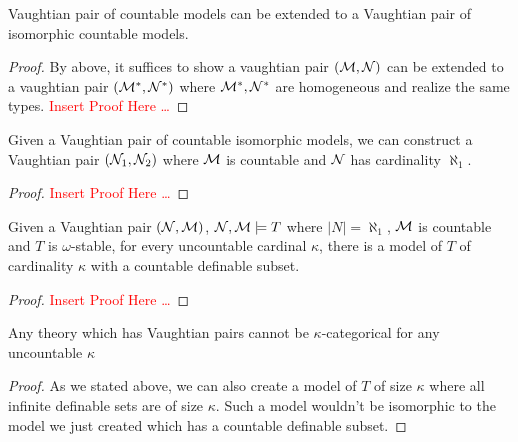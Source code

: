 
\begin{theorem}\label{theorem_vaughtian_pairs_countable_isomorphic}
Vaughtian pair of countable models can be extended to a Vaughtian pair of isomorphic countable models.
\end{theorem}

\begin{proof}
By above, it suffices to show a vaughtian pair \((\mathcal{M}, \mathcal{N})\) can be extended to a vaughtian pair \((\mathcal{M}^*, \mathcal{N}^*)\) where \(\mathcal{M}^*, \mathcal{N}^*\) are homogeneous and realize the same types. 
\textcolor{red}{Insert Proof Here \ldots}
\end{proof}

\begin{theorem}\label{theorem_aleph_one_vaightian_pairs}
Given a Vaughtian pair of countable isomorphic models, we can construct a Vaughtian pair \((\mathcal{N}_1, \mathcal{N}_2)\) where \(\mathcal{M}\) is countable and \(\mathcal{N}\) has cardinality \(\aleph_1\). %
\end{theorem}

\begin{proof}
\textcolor{red}{Insert Proof Here \ldots} 
\end{proof}

\begin{theorem}\label{theorem_uncountable_vaightian_pairs}
Given a Vaughtian pair \((\mathcal{N}, \mathcal{M})\), \(\mathcal{N}, \mathcal{M} \models T\) where \(|N| = \aleph_1\), \(\mathcal{M}\) is countable and \(T\) is \(\omega\)-stable, for every uncountable cardinal \(\kappa\), there is a model of \(T\) of cardinality \(\kappa\) with a countable definable subset.  
\end{theorem}

\begin{proof}
\textcolor{red}{Insert Proof Here \ldots} 
\end{proof}

\begin{theorem}\label{theorem_vaughtian_pairs_categoricity}
Any theory which has Vaughtian pairs cannot be \(\kappa\)-categorical for any uncountable \(\kappa\)
\end{theorem}

\begin{proof}
As we stated above, we can also create a model of \(T\) of size \(\kappa\) where all infinite definable sets are of size \(\kappa\). 
Such a model wouldn't be isomorphic to the model we just created which has a countable definable subset. 
\end{proof}
